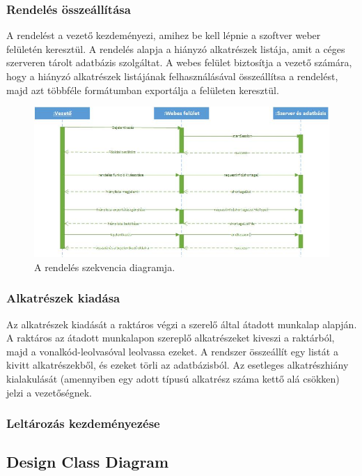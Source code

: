 \documentclass[12pt]{article}\usepackage[left=20mm,right=20mm,top=15mm,bottom=20mm]{geometry}
\begin{document}
\subsubsection{Rendelés összeállítása}
A rendelést a vezető kezdeményezi, amihez be kell lépnie a  szoftver weber felületén keresztül.
A rendelés alapja a hiányzó alkatrészek listája, amit a céges szerveren tárolt adatbázis szolgáltat. 
A webes felület biztosítja a vezető számára, hogy a hiányzó alkatrészek listájának felhasználásával összeállítsa a rendelést, majd azt többféle formátumban exportálja a felületen keresztül.

\begin{figure}[!h]
    \centering
        \includegraphics[width=1.4\textwidth]{kepek/Rendeles_szekvencia.jpg}
        \caption{A rendelés szekvencia diagramja.}
\end{figure}

\subsubsection{Alkatrészek kiadása}
Az alkatrészek kiadását a raktáros végzi a szerelő által átadott munkalap alapján. A raktáros az átadott munkalapon szereplő alkatrészeket kiveszi a raktárból, majd a vonalkód-leolvasóval leolvassa ezeket. 
A rendszer összeállít egy listát a kivitt alkatrészekből, és ezeket törli az adatbázisból.
Az esetleges alkatrészhiány kialakulását (amennyiben egy adott típusú alkatrész száma kettő alá csökken) jelzi a vezetőségnek. 

\subsubsection{Leltározás kezdeményezése}

\subsection{Design Class Diagram}
\end{document}
